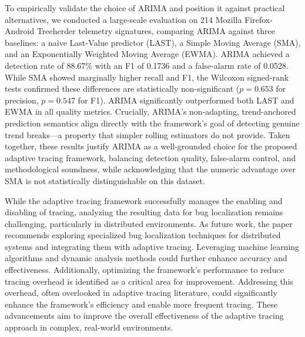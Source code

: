 \documentclass[pdflatex,sn-nature]{sn-jnl}%
\theoremstyle{thmstyleone}%
\theoremstyle{thmstyletwo}%
\theoremstyle{thmstylethree}%
\begin{document}
To empirically validate the choice of ARIMA and position it against practical alternatives, we conducted a large-scale evaluation on 214 Mozilla Firefox-Android Treeherder telemetry signatures, comparing ARIMA against three baselines: a na\"{i}ve Last-Value predictor (LAST), a Simple Moving Average (SMA), and an Exponentially Weighted Moving Average (EWMA). ARIMA achieved a detection rate of 88.67\% with an F1 of 0.1736 and a false-alarm rate of 0.0528. While SMA showed marginally higher recall and F1, the Wilcoxon signed-rank tests confirmed these differences are statistically non-significant ($p{=}0.653$ for precision, $p{=}0.547$ for F1). ARIMA significantly outperformed both LAST and EWMA in all quality metrics. Crucially, ARIMA's non-adapting, trend-anchored prediction semantics align directly with the framework's goal of detecting genuine trend breaks---a property that simpler rolling estimators do not provide. Taken together, these results justify ARIMA as a well-grounded choice for the proposed adaptive tracing framework, balancing detection quality, false-alarm control, and methodological soundness, while acknowledging that the numeric advantage over SMA is not statistically distinguishable on this dataset.

While the adaptive tracing framework successfully manages the enabling and disabling of tracing, analyzing the resulting data for bug localization remains challenging, particularly in distributed environments. As future work, the paper recommends exploring specialized bug localization techniques for distributed systems and integrating them with adaptive tracing. Leveraging machine learning algorithms and dynamic analysis methods could further enhance accuracy and effectiveness. Additionally, optimizing the framework's performance to reduce tracing overhead is identified as a critical area for improvement. Addressing this overhead, often overlooked in adaptive tracing literature, could significantly enhance the framework's efficiency and enable more frequent tracing. These advancements aim to improve the overall effectiveness of the adaptive tracing approach in complex, real-world environments.

\backmatter



\end{document}
